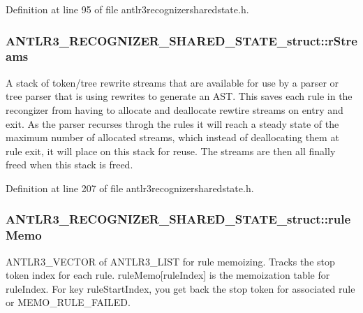 Definition at line 95 of file antlr3recognizersharedstate.\-h.

\hypertarget{struct_a_n_t_l_r3___r_e_c_o_g_n_i_z_e_r___s_h_a_r_e_d___s_t_a_t_e__struct_a3d947576239c08c0edd4b91c8c452e93}{
\subsubsection[{r\-Streams}]{ A\-N\-T\-L\-R3\-\_\-\-R\-E\-C\-O\-G\-N\-I\-Z\-E\-R\-\_\-\-S\-H\-A\-R\-E\-D\-\_\-\-S\-T\-A\-T\-E\-\_\-struct\-::r\-Streams}}\label{struct_a_n_t_l_r3___r_e_c_o_g_n_i_z_e_r___s_h_a_r_e_d___s_t_a_t_e__struct_a3d947576239c08c0edd4b91c8c452e93}
A stack of token/tree rewrite streams that are available for use by a parser or tree parser that is using rewrites to generate an A\-S\-T. This saves each rule in the recongizer from having to allocate and deallocate rewtire streams on entry and exit. As the parser recurses throgh the rules it will reach a steady state of the maximum number of allocated streams, which instead of deallocating them at rule exit, it will place on this stack for reuse. The streams are then all finally freed when this stack is freed. 

Definition at line 207 of file antlr3recognizersharedstate.\-h.

\hypertarget{struct_a_n_t_l_r3___r_e_c_o_g_n_i_z_e_r___s_h_a_r_e_d___s_t_a_t_e__struct_a473f17f4b71e9674352e5150314897de}{
\subsubsection[{rule\-Memo}]{ A\-N\-T\-L\-R3\-\_\-\-R\-E\-C\-O\-G\-N\-I\-Z\-E\-R\-\_\-\-S\-H\-A\-R\-E\-D\-\_\-\-S\-T\-A\-T\-E\-\_\-struct\-::rule\-Memo}}\label{struct_a_n_t_l_r3___r_e_c_o_g_n_i_z_e_r___s_h_a_r_e_d___s_t_a_t_e__struct_a473f17f4b71e9674352e5150314897de}
A\-N\-T\-L\-R3\-\_\-\-V\-E\-C\-T\-O\-R of A\-N\-T\-L\-R3\-\_\-\-L\-I\-S\-T for rule memoizing. Tracks the stop token index for each rule. rule\-Memo\mbox{[}rule\-Index\mbox{]} is the memoization table for rule\-Index. For key rule\-Start\-Index, you get back the stop token for associated rule or M\-E\-M\-O\-\_\-\-R\-U\-L\-E\-\_\-\-F\-A\-I\-L\-E\-D.

